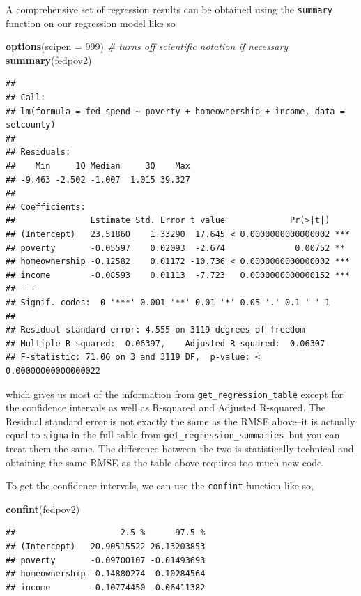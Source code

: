 \documentclass[
]{book}
\newenvironment{Shaded}{\begin{snugshade}}{\end{snugshade}}
\newcommand{\CommentTok}[1]{\textcolor[rgb]{0.56,0.35,0.01}{\textit{#1}}}
\newcommand{\DataTypeTok}[1]{\textcolor[rgb]{0.13,0.29,0.53}{#1}}
\newcommand{\DecValTok}[1]{\textcolor[rgb]{0.00,0.00,0.81}{#1}}
\newcommand{\KeywordTok}[1]{\textcolor[rgb]{0.13,0.29,0.53}{\textbf{#1}}}
\newcommand{\NormalTok}[1]{#1}
\begin{document}
A comprehensive set of regression results can be obtained using the \texttt{summary} function on our regression model like so

\begin{Shaded}
\begin{Highlighting}[]
\KeywordTok{options}\NormalTok{(}\DataTypeTok{scipen =} \DecValTok{999}\NormalTok{) }\CommentTok{# turns off scientific notation if necessary}
\KeywordTok{summary}\NormalTok{(fedpov2)}
\end{Highlighting}
\end{Shaded}

\begin{verbatim}
## 
## Call:
## lm(formula = fed_spend ~ poverty + homeownership + income, data = selcounty)
## 
## Residuals:
##    Min     1Q Median     3Q    Max 
## -9.463 -2.502 -1.007  1.015 39.327 
## 
## Coefficients:
##               Estimate Std. Error t value             Pr(>|t|)    
## (Intercept)   23.51860    1.33290  17.645 < 0.0000000000000002 ***
## poverty       -0.05597    0.02093  -2.674              0.00752 ** 
## homeownership -0.12582    0.01172 -10.736 < 0.0000000000000002 ***
## income        -0.08593    0.01113  -7.723   0.0000000000000152 ***
## ---
## Signif. codes:  0 '***' 0.001 '**' 0.01 '*' 0.05 '.' 0.1 ' ' 1
## 
## Residual standard error: 4.555 on 3119 degrees of freedom
## Multiple R-squared:  0.06397,	Adjusted R-squared:  0.06307 
## F-statistic: 71.06 on 3 and 3119 DF,  p-value: < 0.00000000000000022
\end{verbatim}

which gives us most of the information from \texttt{get\_regression\_table} except for the confidence intervals as well as R-squared and Adjusted R-squared. The Residual standard error is not exactly the same as the RMSE above--it is actually equal to \texttt{sigma} in the full table from \texttt{get\_regression\_summaries}--but you can treat them the same. The difference between the two is statistically technical and obtaining the same RMSE as the table above requires too much new code.

To get the confidence intervals, we can use the \texttt{confint} function like so,

\begin{Shaded}
\begin{Highlighting}[]
\KeywordTok{confint}\NormalTok{(fedpov2)}
\end{Highlighting}
\end{Shaded}

\begin{verbatim}
##                     2.5 %      97.5 %
## (Intercept)   20.90515522 26.13203853
## poverty       -0.09700107 -0.01493693
## homeownership -0.14880274 -0.10284564
## income        -0.10774450 -0.06411382
\end{verbatim}
\end{document}
